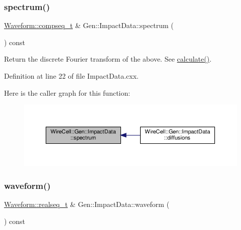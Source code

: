 \subsubsection{\texorpdfstring{spectrum()}{spectrum()}}
{\footnotesize\ttfamily \hyperlink{namespace_wire_cell_1_1_waveform_a7e4a8d371f774438bb360e7d1dcb583a}{Waveform\+::compseq\+\_\+t} \& Gen\+::\+Impact\+Data\+::spectrum (\begin{DoxyParamCaption}{ }\end{DoxyParamCaption}) const}

Return the discrete Fourier transform of the above. See {\ttfamily \hyperlink{class_wire_cell_1_1_gen_1_1_impact_data_a323019d50d44dea084f1691da674b755}{calculate()}}. 

Definition at line 22 of file Impact\+Data.\+cxx.

Here is the caller graph for this function\+:
\nopagebreak
\begin{figure}[H]
\begin{center}
\leavevmode
\includegraphics[width=350pt]{class_wire_cell_1_1_gen_1_1_impact_data_afb1c936f26afc1f968f727b3f72af2e4_icgraph}
\end{center}
\end{figure}
\mbox{\label{class_wire_cell_1_1_gen_1_1_impact_data_a80d2f6a9ccdbba236c9e75360316b014}} 
\subsubsection{\texorpdfstring{waveform()}{waveform()}}
{\footnotesize\ttfamily \hyperlink{namespace_wire_cell_1_1_waveform_a479175e541c8545e87cd8063b74b6956}{Waveform\+::realseq\+\_\+t} \& Gen\+::\+Impact\+Data\+::waveform (\begin{DoxyParamCaption}{ }\end{DoxyParamCaption}) const}


